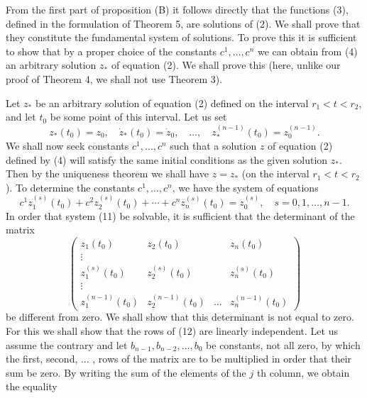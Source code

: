 \documentclass[10pt,a5paper]{book}
\makeatletter
\theoremstyle{plain}
\theoremstyle{definition}
\theoremstyle{remark}
\renewenvironment{proof}[1][\proofname]{\par
  \pushQED{\qed}%
  \normalfont\topsep6\p@\@plus6\p@\relax
  \trivlist
  \item\relax{\itshape #1\@addpunct{.}}\hspace\labelsep\ignorespaces
}{\popQED\endtrivlist\@endpefalse}
\makeatother
\begin{document}
\begin{proof}[Proof of Theorem 5]
From the first part of proposition (B) it follows directly that the functions (3), defined in the formulation of Theorem 5, are solutions of (2). We shall prove that they constitute the fundamental system of solutions. To prove this it is sufficient to show that by a proper choice of the constants $c^{1}, \ldots, c^{n}$ we can obtain from (4) an arbitrary solution $z_{*}$ of equation (2). We shall prove this (here, unlike our proof of Theorem 4, we shall not use Theorem 3).

Let $z_{*}$ be an arbitrary solution of equation (2) defined on the interval $r_{1}<t<r_{2}$, and let $t_{0}$ be some point of this interval. Let us set
\[
z_{*}\left(t_{0}\right)=z_{0}, \quad \dot{z}_{*}\left(t_{0}\right)=\dot{z}_{0}, \quad \ldots, \quad z_{*}^{(n-1)}\left(t_{0}\right)=z_{0}^{(n-1)} .
\]
We shall now seek constants $c^{1}, \ldots, c^{n}$ such that a solution $z$ of equation (2) defined by (4) will satisfy the same initial conditions as the given solution $z_{*}$. Then by the uniqueness theorem we shall have $z=z_{*}$ (on the interval $r_{1}<t<r_{2}$ ). To determine the constants $c^{1}, \ldots, c^{n}$, we
have the system of equations
\begin{equation*}
c^{1} z_{1}^{(s)}\left(t_{0}\right)+c^{2} z_{2}^{(s)}\left(t_{0}\right)+\cdots+c^{n} z_{n}^{(s)}\left(t_{0}\right)=z_{0}^{(s)}, \quad s=0,1, \ldots, n-1 . \tag{11}
\end{equation*}
In order that system (11) be solvable, it is sufficient that the determinant of the matrix
\[
\left(\begin{array}{cccc}
z_{1}\left(t_{0}\right) & z_{2}\left(t_{0}\right) & & z_{n}\left(t_{0}\right)  \tag{12}\\
\vdots & & & \\
z_{1}^{(s)}\left(t_{0}\right) & z_{2}^{(s)}\left(t_{0}\right) & & z_{n}^{(s)}\left(t_{0}\right) \\
\vdots & & & \\
z_{1}^{(n-1)}\left(t_{0}\right) & z_{2}^{(n-1)}\left(t_{0}\right) & \ldots & z_{n}^{(n-1)}\left(t_{0}\right)
\end{array}\right)
\]
be different from zero. We shall show that this determinant is not equal to zero. For this we shall show that the rows of (12) are linearly independent. Let us assume the contrary and let $b_{n-1}, b_{n-2}, \ldots, b_{0}$ be constants, not all zero, by which the first, second, ... , rows of the matrix are to be multiplied in order that their sum be zero. By writing the sum of the elements of the $j$ th column, we obtain the equality

\end{proof}
\end{document}

